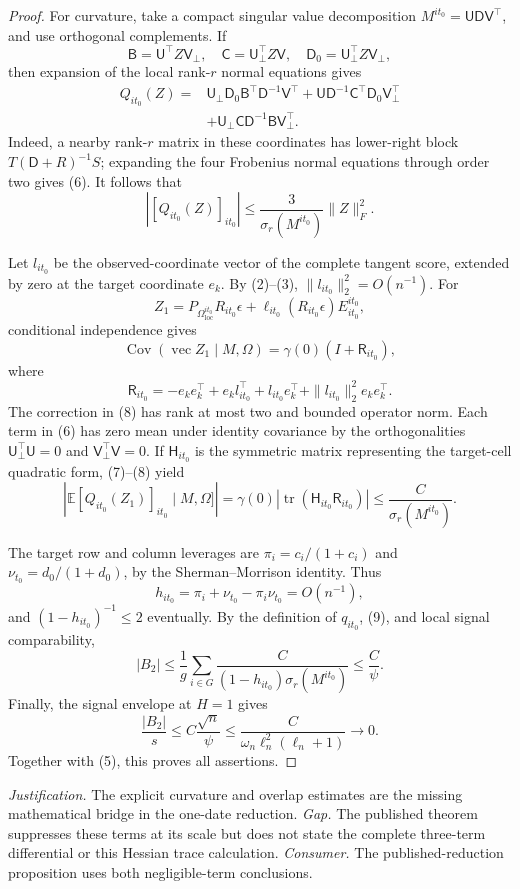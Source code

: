 \documentclass{article}
\begin{document}
\begin{proof}
For curvature, take a compact singular value decomposition
\(M^{it_0}=\mathsf U\mathsf D\mathsf V^{\top}\), and use orthogonal complements.  If
\[
 \mathsf B=\mathsf U^{\top}Z\mathsf V_\perp,
 \quad \mathsf C=\mathsf U_\perp^{\top}Z\mathsf V,
 \quad \mathsf D_0=\mathsf U_\perp^{\top}Z\mathsf V_\perp,
\]
then expansion of the local rank-\(r\) normal equations gives
\[
 \begin{aligned}
 Q_{it_0}(Z)={}&
 \mathsf U_\perp\mathsf D_0\mathsf B^{\top}\mathsf D^{-1}\mathsf V^{\top}
 +\mathsf U\mathsf D^{-1}\mathsf C^{\top}\mathsf D_0\mathsf V_\perp^{\top}\\
 &+\mathsf U_\perp\mathsf C\mathsf D^{-1}\mathsf B\mathsf V_\perp^{\top}.
 \end{aligned}
 \tag{6}
\]
Indeed, a nearby rank-\(r\) matrix in these coordinates has lower-right block \(T(\mathsf D+R)^{-1}S\); expanding the four Frobenius normal equations through order two gives (6).  It follows that
\[
 |[Q_{it_0}(Z)]_{it_0}|
 \le\frac{3}{\sigma_r(M^{it_0})}\|Z\|_F^2.
 \tag{7}
\]

Let \(l_{it_0}\) be the observed-coordinate vector of the complete tangent score, extended by zero at the target coordinate \(e_k\).  By (2)--(3), \(\|l_{it_0}\|_2^2=O(n^{-1})\).  For
\[
 Z_1=P_{\Omega_{\mathrm{loc}}^{it_0}}R_{it_0}\epsilon
 +\ell_{it_0}(R_{it_0}\epsilon)E^{it_0}_{it_0},
\]
conditional independence gives
\[
 \operatorname{Cov}(\operatorname{vec}Z_1\mid M,\Omega)
 =\gamma(0)(I+\mathsf R_{it_0}),
\]
where
\[
 \mathsf R_{it_0}=-e_ke_k^{\top}+e_kl_{it_0}^{\top}
 +l_{it_0}e_k^{\top}+\|l_{it_0}\|_2^2e_ke_k^{\top}.
 \tag{8}
\]
The correction in (8) has rank at most two and bounded operator norm.  Each term in (6) has zero mean under identity covariance by the orthogonalities \(\mathsf U_\perp^{\top}\mathsf U=0\) and \(\mathsf V_\perp^{\top}\mathsf V=0\).  If \(\mathsf H_{it_0}\) is the symmetric matrix representing the target-cell quadratic form, (7)--(8) yield
\[
 |\mathbb E[Q_{it_0}(Z_1)]_{it_0}\mid M,\Omega]|
 =\gamma(0)|\operatorname{tr}(\mathsf H_{it_0}\mathsf R_{it_0})|
 \le\frac{C}{\sigma_r(M^{it_0})}.
 \tag{9}
\]

The target row and column leverages are \(\pi_i=c_i/(1+c_i)\) and \(\nu_{t_0}=d_0/(1+d_0)\), by the Sherman--Morrison identity.  Thus
\[
 h_{it_0}=\pi_i+\nu_{t_0}-\pi_i\nu_{t_0}=O(n^{-1}),
\]
and \((1-h_{it_0})^{-1}\le2\) eventually.  By the definition of \(q_{it_0}\), (9), and local signal comparability,
\[
 |B_2|\le\frac1g\sum_{i\in G}
 \frac{C}{(1-h_{it_0})\sigma_r(M^{it_0})}
 \le\frac{C}{\psi}.
 \tag{10}
\]
Finally, the signal envelope at \(H=1\) gives
\[
 \frac{|B_2|}{s}
 \le C\frac{\sqrt n}{\psi}
 \le\frac{C}{\omega_n\ell_n^2(\ell_n+1)}\longrightarrow0.
\]
Together with (5), this proves all assertions.
\end{proof}
\par\smallskip\noindent \textit{Justification.} The explicit curvature and overlap estimates are the missing mathematical bridge in the one-date reduction. \textit{Gap.} The published theorem suppresses these terms at its scale but does not state the complete three-term differential or this Hessian trace calculation. \textit{Consumer.} The published-reduction proposition uses both negligible-term conclusions.
\end{document}
